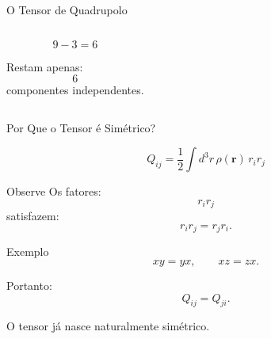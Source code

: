 \documentclass[aspectratio=169]{beamer}
\begin{document}
\begin{frame}{O Tensor de Quadrupolo}
\begin{columns}[T]
\vspace{0.3cm}

\begin{center}

\Huge
\[
9-3=6
\]

\vspace{0.2cm}

\Large
Restam apenas:
\[
6
\]
componentes independentes.

\end{center}

\end{columns}

\end{frame}

\begin{frame}{Por Que o Tensor é Simétrico?}

\begin{eqbox}
\begin{equation}
Q_{ij}
=
\frac12
\int d^3r\,
\rho(\mathbf r)\,
r_i r_j
\tag{4.53 revisitada}
\end{equation}
\end{eqbox}

\begin{mybox}{Observe}
Os fatores:
\[
r_i r_j
\]
satisfazem:
\[
r_i r_j=r_j r_i.
\]
\end{mybox}

\begin{alertblock}{Exemplo}
\[
xy=yx,
\qquad
xz=zx.
\]
\end{alertblock}

\begin{center}

Portanto:
\[
Q_{ij}=Q_{ji}.
\]

O tensor já nasce naturalmente simétrico.

\end{center}

\end{frame}

\end{document}
